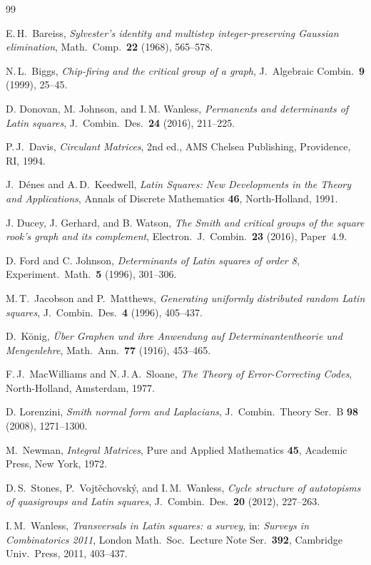 \documentclass[11pt,a4paper]{article}
\begin{document}
\begin{thebibliography}{99}

E.\,H.~Bareiss,
\emph{Sylvester's identity and multistep integer-preserving Gaussian elimination},
Math.\ Comp.\ \textbf{22} (1968), 565--578.

N.\,L.~Biggs,
\emph{Chip-firing and the critical group of a graph},
J.\ Algebraic Combin.\ \textbf{9} (1999), 25--45.

D. Donovan, M. Johnson, and I.\,M. Wanless,
\emph{Permanents and determinants of Latin squares},
J.\ Combin.\ Des.\ \textbf{24} (2016), 211--225.

P.\,J.~Davis,
\emph{Circulant Matrices}, 2nd ed.,
AMS Chelsea Publishing, Providence, RI, 1994.

J.~D\'enes and A.\,D.~Keedwell,
\emph{Latin Squares: New Developments in the Theory and Applications},
Annals of Discrete Mathematics \textbf{46}, North-Holland, 1991.

J. Ducey, J. Gerhard, and B. Watson,
\emph{The Smith and critical groups of the square rook's graph and its complement},
Electron.\ J.\ Combin.\ \textbf{23} (2016), Paper~4.9.

D. Ford and C. Johnson,
\emph{Determinants of Latin squares of order 8},
Experiment.\ Math.\ \textbf{5} (1996), 301--306.

M.\,T.~Jacobson and P.~Matthews,
\emph{Generating uniformly distributed random Latin squares},
J.\ Combin.\ Des.\ \textbf{4} (1996), 405--437.

D.~K\"onig,
\emph{\"Uber Graphen und ihre Anwendung auf Determinantentheorie und
Mengenlehre},
Math.\ Ann.\ \textbf{77} (1916), 453--465.

F.\,J.~MacWilliams and N.\,J.\,A.~Sloane,
\emph{The Theory of Error-Correcting Codes},
North-Holland, Amsterdam, 1977.

D. Lorenzini,
\emph{Smith normal form and Laplacians},
J.\ Combin.\ Theory Ser.\ B \textbf{98} (2008), 1271--1300.

M.~Newman,
\emph{Integral Matrices},
Pure and Applied Mathematics \textbf{45}, Academic Press, New York, 1972.

D.\,S.~Stones, P.~Vojt\v{e}chovsk\'y, and I.\,M.~Wanless,
\emph{Cycle structure of autotopisms of quasigroups and Latin squares},
J.\ Combin.\ Des.\ \textbf{20} (2012), 227--263.

I.\,M.~Wanless,
\emph{Transversals in Latin squares: a survey},
in: \emph{Surveys in Combinatorics 2011}, London Math.\ Soc.\ Lecture Note Ser.\
\textbf{392}, Cambridge Univ.\ Press, 2011, 403--437.

\end{thebibliography}
\end{document}
